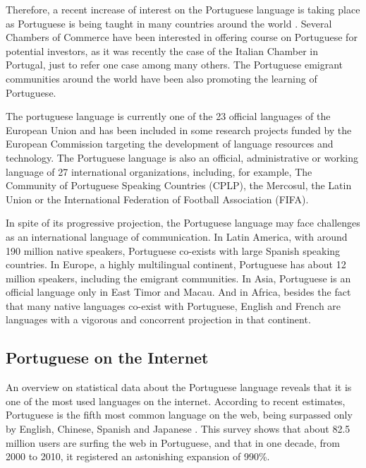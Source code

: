 \begin{multicols}{2}
Therefore, a recent increase of interest on the Portuguese language is taking place as Portuguese is being taught in many countries around the world \cite{camoes2}. Several Chambers of Commerce have been interested in offering course on Portuguese for potential investors, 
as it was recently the case of the Italian Chamber in Portugal, just to refer one case among many others. 
The Portuguese emigrant communities around the world have been also promoting the learning of Portuguese.


The portuguese language is currently one of the 23 official languages of the European Union and has been included in some research projects funded by the European Commission targeting the development of language resources and technology. The Portuguese language is also an official, administrative or working language of 27 international organizations, including, for example, The Community of Portuguese Speaking Countries (CPLP), the Mercosul, the Latin Union or the International Federation of Football Association (FIFA).


In spite of its progressive projection, the Portuguese language may face challenges as an international language of communication. 
In Latin America, with around 190 million native speakers, Portuguese co-exists with large Spanish speaking countries. 
In Europe, a highly multilingual continent, Portuguese has about 12 million speakers, including the emigrant communities. 
In Asia, Portuguese is an official language only in East Timor and Macau. 
And in Africa, besides the fact that many native languages co-exist with Portuguese, English and French are languages with a vigorous and
concorrent projection in that continent. 

\subsection{Portuguese on the Internet}

An overview on statistical data about the Portuguese language reveals that it is one of the most used languages on the internet. 
According to recent estimates, Portuguese is the fifth most common language on the web, being surpassed only by English, Chinese, Spanish and Japanese \cite{twtrcon}. 
This survey shows that about 82.5 million users are surfing the web in Portuguese, and that in one decade, from 2000 to 2010, it registered an astonishing expansion of 990\%.


\end{multicols}
